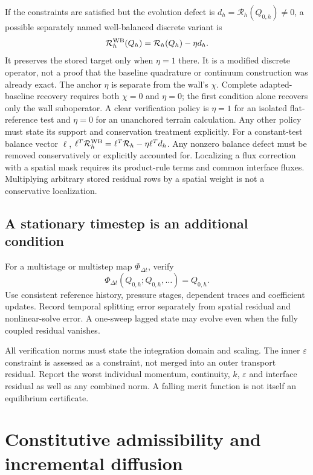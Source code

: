 \documentclass[11pt,a4paper]{article}
\numberwithin{equation}{section}
\newcommand{\eps}{\varepsilon}
\begin{document}
If the constraints are satisfied but the evolution defect is
$d_h=\mathcal R_h(Q_{0,h})\ne0$, a possible separately named
well-balanced discrete variant is
\begin{equation}
 \mathcal R_h^{\rm WB}(Q_h)=\mathcal R_h(Q_h)-\eta d_h.
 \label{eq:optional-defect}
\end{equation}
It preserves the stored target only when $\eta=1$ there. It is a
modified discrete operator, not a proof that the baseline quadrature
or continuum construction was already exact. The anchor $\eta$ is
separate from the wall's $\chi$.
Complete adapted-baseline recovery requires both $\chi=0$ and
$\eta=0$; the first condition alone recovers only the wall suboperator.
A clear verification policy is $\eta=1$ for an isolated flat-reference
test and $\eta=0$ for an unanchored terrain calculation. Any other
policy must state its support and conservation treatment explicitly.
For a constant-test balance vector $\ell$,
$\ell^T\mathcal R_h^{\rm WB}=\ell^T\mathcal R_h-\eta\ell^Td_h$.
Any nonzero balance defect must be removed conservatively or explicitly
accounted for. Localizing a flux correction with a spatial mask requires
its product-rule terms and common interface fluxes. Multiplying
arbitrary stored residual rows by a spatial weight is not a conservative
localization.

\subsection{A stationary timestep is an additional condition}
For a multistage or multistep map $\Phi_{\Delta t}$, verify
\begin{equation}
 \Phi_{\Delta t}(Q_{0,h};Q_{0,h},\ldots)=Q_{0,h}.
 \label{eq:time-fixed-point}
\end{equation}
Use consistent reference history, pressure stages, dependent traces and
coefficient updates. Record temporal splitting error separately from
spatial residual and nonlinear-solve error. A one-sweep lagged state
may evolve even when the fully coupled residual vanishes.

All verification norms must state the integration domain and scaling.
The inner $\eps$ constraint is assessed as a constraint, not merged into
an outer transport residual. Report the worst individual momentum,
continuity, $k$, $\eps$ and interface residual as well as any combined
norm. A falling merit function is not itself an equilibrium certificate.


\section{Constitutive admissibility and incremental diffusion}
\label{sec:wjstab}
\end{document}
